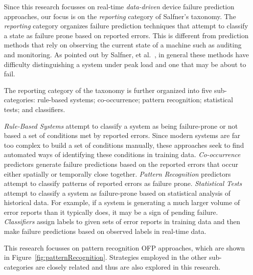 
Since this research focusses on real-time \emph{data-driven} device failure
prediction approaches, our focus is on the \emph{reporting} category of
Salfner's taxonomy.  The \emph{reporting} category organizes failure prediction
techniques that attempt to classify a state as failure prone based on reported
errors.  This is different from prediction methods that rely on observing the
current state of a machine such as auditing and monitoring.  As pointed out by
Salfner, et al.~\cite{salfnerSurvey}, in general these methods have difficulty
distinguishing a system under peak load and one that may be about to fail.

The reporting category of the taxonomy is further organized into five
sub-categories: rule-based systems; co-occurrence; pattern recognition;
statistical tests; and classifiers.

\emph{Rule-Based Systems} attempt to classify a system as being failure-prone
or not based a set of conditions met by reported errors.  Since modern systems
are far too complex to build a set of conditions manually, these approaches
seek to find automated ways of identifying these conditions in training data.
\emph{Co-occurrence} predictors generate failure predictions based on the
reported errors that occur either spatially or temporally close together.
\emph{Pattern Recognition} predictors attempt to classify patterns of reported
errors as failure prone.  \emph{Statistical Tests} attempt to classify a system
as failure-prone based on statistical analysis of historical data.  For
example, if a system is generating a much larger volume of error reports than
it typically does, it may be a sign of pending failure.  \emph{Classifiers}
assign labels to given sets of error reports in training data and then make
failure predictions based on observed labels in real-time data.  

This research focusses on pattern recognition OFP approaches, which are shown
in Figure~\ref{fig:patternRecognition}.  Strategies employed in the other
sub-categories are closely related and thus are also explored in this research.

\figpatternRecognition{\textwidth}

